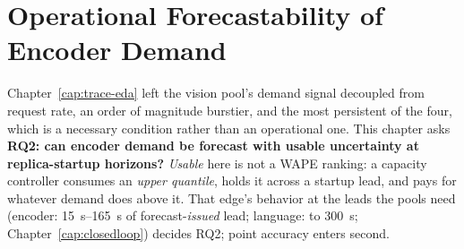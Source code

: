 \chapter{Operational Forecastability of Encoder Demand}
\label{cap:predictors}

Chapter~\ref{cap:trace-eda} left the vision pool's demand signal decoupled
from request rate, an order of magnitude burstier, and the most persistent
of the four, which is a necessary condition rather than an operational one.
This chapter asks \textbf{RQ2: can encoder demand be forecast with usable
uncertainty at replica-startup horizons?} \emph{Usable} here is not a WAPE
ranking: a capacity controller consumes an \emph{upper quantile}, holds it
across a startup lead, and pays for whatever demand does above it. That
edge's behavior at the leads the pools need (encoder:
\SIrange{15}{165}{\second} of forecast-\emph{issued} lead; language: to
\SI{300}{\second}; Chapter~\ref{cap:closedloop}) decides RQ2; point accuracy
enters second.

